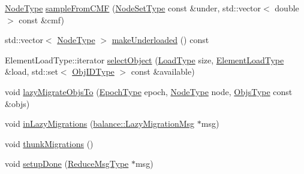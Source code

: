 \begin{DoxyCompactItemize}
\item 
\hyperlink{namespacevt_a866da9d0efc19c0a1ce79e9e492f47e2}{Node\+Type} \hyperlink{structvt_1_1vrt_1_1collection_1_1lb_1_1_gossip_l_b_a1a9e88510b1b61a181c9b4dcb3a8c153}{sample\+From\+C\+MF} (\hyperlink{structvt_1_1vrt_1_1collection_1_1lb_1_1_gossip_l_b_abb53f1d4bd3c37f3e68c3b5b0e1f1c86}{Node\+Set\+Type} const \&under, std\+::vector$<$ double $>$ const \&cmf)
\item 
std\+::vector$<$ \hyperlink{namespacevt_a866da9d0efc19c0a1ce79e9e492f47e2}{Node\+Type} $>$ \hyperlink{structvt_1_1vrt_1_1collection_1_1lb_1_1_gossip_l_b_a244326d030b7b9b82328d2ce617fef43}{make\+Underloaded} () const
\item 
Element\+Load\+Type\+::iterator \hyperlink{structvt_1_1vrt_1_1collection_1_1lb_1_1_gossip_l_b_adafa0d7c3295e095149f48c3027b3173}{select\+Object} (\hyperlink{structvt_1_1vrt_1_1collection_1_1lb_1_1_base_l_b_a215e22b9f12678303f49615ae3be05cc}{Load\+Type} size, \hyperlink{structvt_1_1vrt_1_1collection_1_1lb_1_1_base_l_b_aa286d31a0820a8fc9218ccb858368fca}{Element\+Load\+Type} \&load, std\+::set$<$ \hyperlink{structvt_1_1vrt_1_1collection_1_1lb_1_1_base_l_b_a15a2f756b59c8c2437985206b32aa403}{Obj\+I\+D\+Type} $>$ const \&available)
\item 
void \hyperlink{structvt_1_1vrt_1_1collection_1_1lb_1_1_gossip_l_b_a12cd87d3d0f4c186ffca1b554f5086dc}{lazy\+Migrate\+Objs\+To} (\hyperlink{namespacevt_a985a5adf291c34a3ca263b3378388236}{Epoch\+Type} epoch, \hyperlink{namespacevt_a866da9d0efc19c0a1ce79e9e492f47e2}{Node\+Type} node, \hyperlink{structvt_1_1vrt_1_1collection_1_1lb_1_1_gossip_l_b_ad2093cf08cc6af0f3deb4441e40c55a9}{Objs\+Type} const \&objs)
\item 
void \hyperlink{structvt_1_1vrt_1_1collection_1_1lb_1_1_gossip_l_b_a2fa63a6d2dc211423423b0d7de1d1ed6}{in\+Lazy\+Migrations} (\hyperlink{structvt_1_1vrt_1_1collection_1_1balance_1_1_lazy_migration_msg}{balance\+::\+Lazy\+Migration\+Msg} $\ast$msg)
\item 
void \hyperlink{structvt_1_1vrt_1_1collection_1_1lb_1_1_gossip_l_b_a7693c8b06ab78ef3565687621d810450}{thunk\+Migrations} ()
\item 
void \hyperlink{structvt_1_1vrt_1_1collection_1_1lb_1_1_gossip_l_b_a8ac1a82bee0f81996362076df16c2379}{setup\+Done} (\hyperlink{structvt_1_1vrt_1_1collection_1_1lb_1_1_gossip_l_b_ad251f887a319f433771b084187ef6089}{Reduce\+Msg\+Type} $\ast$msg)
\end{DoxyCompactItemize}
